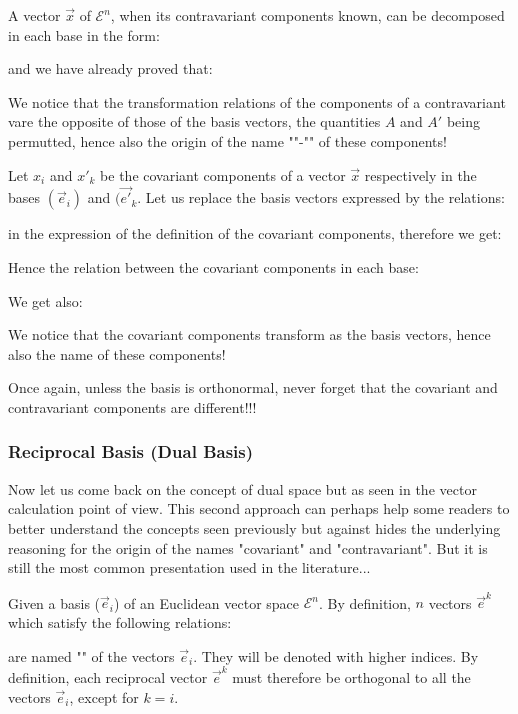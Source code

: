 	A vector $\vec{x}$ of $\mathcal{E}^n$, when its contravariant components known, can be decomposed in each base in the form:
	
	and we have already proved that:
	
	We notice that the transformation relations of the components of a contravariant vare the opposite of those of the basis vectors, the quantities $A$ and $A '$ being permutted, hence also the origin of the name ""-"" of these components!

	Let $x_i$ and ${x'}_k$ be the covariant components of a vector $\vec{x}$ respectively in the bases $(\vec{e}_i)$ and $(\vec{e'}_k$. Let us replace the basis vectors expressed by the relations:
	
	in the expression of the definition of the covariant components, therefore we get:
	
	Hence the relation between the covariant components in each base:
	
	We get also:
	
	We notice that the covariant components transform as the basis vectors, hence also the name of these components!
	
	Once again, unless the basis is orthonormal, never forget that the covariant and contravariant components are different!!!
	
	\subsubsection{Reciprocal Basis (Dual Basis)}
	Now let us come back on the concept of dual space but as seen in the vector calculation point of view. This second approach can perhaps help some readers to better understand the concepts seen previously but against hides the underlying reasoning for the origin of the names "covariant" and "contravariant". But it is still the most common presentation used in the literature...
	
	Given a basis ($\vec{e}_i$) of an Euclidean vector space $\mathcal{E}^n$. By definition, $n$ vectors $\vec{e}^k$ which satisfy the following relations:
	
	are named "" of the vectors $\vec{e}_i$. They will be denoted with higher indices. By definition, each reciprocal vector $\vec{e}^k$ must therefore be orthogonal to all the vectors $\vec{e}_i$, except for $k=i$.
	
